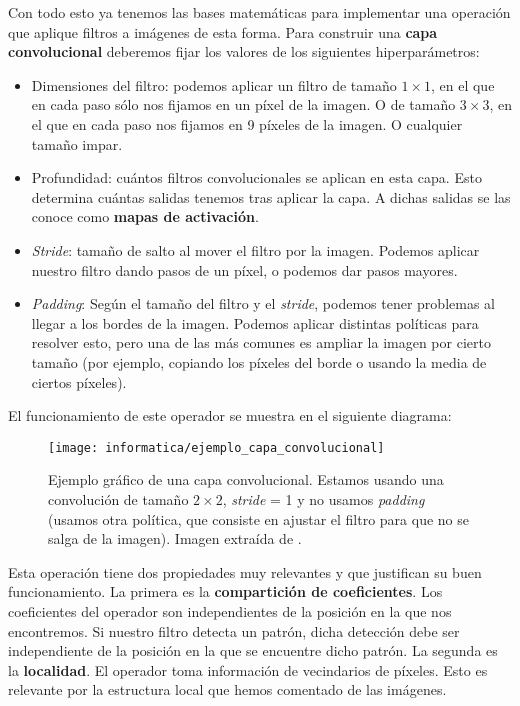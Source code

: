 Con todo esto ya tenemos las bases matemáticas para implementar una operación que aplique filtros a imágenes de esta forma. Para construir una \textbf{capa convolucional} deberemos fijar los valores de los siguientes hiperparámetros:

\begin{itemize}
    \item Dimensiones del filtro: podemos aplicar un filtro de tamaño $1 \times 1$, en el que en cada paso sólo nos fijamos en un píxel de la imagen. O de tamaño $3 \times 3$, en el que en cada paso nos fijamos en 9 píxeles de la imagen. O cualquier tamaño impar.
    \item Profundidad: cuántos filtros convolucionales se aplican en esta capa. Esto determina cuántas salidas tenemos tras aplicar la capa. A dichas salidas se las conoce como \textbf{mapas de activación}.
    \item \textit{Stride}: tamaño de salto al mover el filtro por la imagen. Podemos aplicar nuestro filtro dando pasos de un píxel, o podemos dar pasos mayores.
    \item \textit{Padding}: Según el tamaño del filtro y el \textit{stride}, podemos tener problemas al llegar a los bordes de la imagen. Podemos aplicar distintas políticas para resolver esto, pero una de las más comunes es ampliar la imagen por cierto tamaño (por ejemplo, copiando los píxeles del borde o usando la media de ciertos píxeles).
\end{itemize}

El funcionamiento de este operador se muestra en el siguiente diagrama:

\begin{figure}[H]
    \centering
    \texttt{[image: informatica/ejemplo\_capa\_convolucional]}
    \caption{Ejemplo gráfico de una capa convolucional. Estamos usando una convolución de tamaño $2 \times 2$, \textit{stride} = 1 y no usamos \textit{padding} (usamos otra política, que consiste en ajustar el filtro para que no se salga de la imagen). Imagen extraída de \cite{informatica:paper_definicion_cnn}.}
\end{figure}

Esta operación tiene dos propiedades muy relevantes y que justifican su buen funcionamiento. La primera es la \textbf{compartición de coeficientes}. Los coeficientes del operador son independientes de la posición en la que nos encontremos. Si nuestro filtro detecta un patrón, dicha detección debe ser independiente de la posición en la que se encuentre dicho patrón. La segunda es la \textbf{localidad}. El operador toma información de vecindarios de píxeles. Esto es relevante por la estructura local que hemos comentado de las imágenes.

